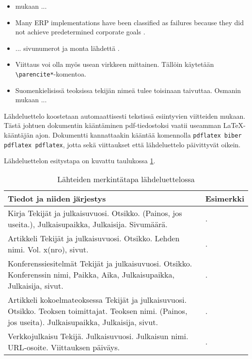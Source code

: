 \begin{itemize}
	\item \textcite[ss.~32--34]{lehman2014biblatex} mukaan ...
	\item Many ERP implementations have been classified as failures because they did not achieve predetermined corporate goals \cite{umble2003enterprise}.
	\item ... sivunumerot ja monta lähdettä \cites[189]{osmani2013}[1]{knuth1973fundamental}.
	\item Viittaus voi olla myös usean virkkeen mittainen. Tällöin käytetään \verb+\parencite*+-komentoa. \cite*{somers2001impact}
	\item Suomenkielisissä teoksissa tekijän nimeä tulee toisinaan taivuttaa. Osmanin \citeyear[12]{osmani2013} mukaan ...
\end{itemize}

Lähdeluettelo koostetaan automaattisesti tekstissä esiintyvien viitteiden mukaan.
Tästä johtuen dokumentin kääntäminen pdf-tiedostoksi vaatii useamman \LaTeX-kääntäjän ajon.
Dokumentti kannattaakin kääntää komennolla \texttt{pdflatex biber pdflatex pdflatex}, jotta sekä viittaukset että lähdeluettelo päivittyvät oikein.

Lähdeluettelon esitystapa on kuvattu taulukossa \ref{table:bibliography}.

\begin{table}
\caption{Lähteiden merkintätapa lähdeluettelossa}
\label{table:bibliography}
\begin{center}
\begin{tabular}{ | p{7cm} | p{7cm} | }
	\hline
	\textbf{Tiedot ja niiden järjestys} & \textbf{Esimerkki} \\ \hline
	Kirja \newline 	Tekijät ja julkaisuvuosi. Otsikko. (Painos, jos useita.), Julkaisupaikka, Julkaisija. Sivumäärä. & \fullcite{basar1995dynamic}. \\ \hline
	Artikkeli \newline Tekijät ja julkaisuvuosi. Otsikko. Lehden nimi. Vol. x(nro), sivut. & \fullcite{umble2003enterprise}. \\ \hline
	Konferenssiesitelmät \newline Tekijät ja julkaisuvuosi. Otsikko. Konferenssin nimi, Paikka, Aika, Julkaisupaikka, Julkaisija, sivut. & \fullcite{somers2001impact}. \\ \hline 
	Artikkeli kokoelmateoksessa \newline Tekijät ja julkaisuvuosi. Otsikko. Teoksen toimittajat. Teoksen nimi. (Painos, jos useita). Julkaisupaikka, Julkaisija, sivut. & \fullcite{osmani2013}. \\ \hline
	Verkkojulkaisu \newline Tekijä. Julkaisuvuosi. Julkaisun nimi. URL-osoite. Viittauksen päiväys. & \fullcite{lehman2014biblatex}. \\
	\hline
\end{tabular}
\end{center}
\end{table}

